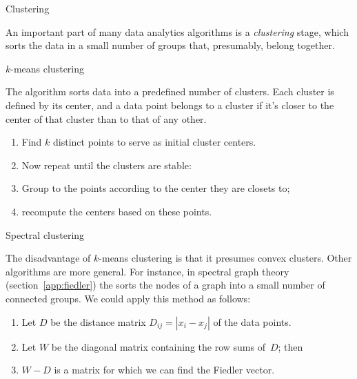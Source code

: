 
\def\R{{\cal R}}

 {Clustering}

An important part of many data analytics algorithms
is a \emph{clustering} stage, which sorts the data
in a small number of groups that, presumably, belong together.

 {$k$-means clustering}

The  algorithm sorts data
into a predefined number of clusters. Each cluster is defined by
its center, and a data point belongs to a cluster if it's closer
to the center of that cluster than to that of any other.

\begin{enumerate}
\item Find $k$ distinct points to serve as initial cluster centers.
\item Now repeat until the clusters are stable:
\item Group to the points according to the center they are closets to;
\item recompute the centers based on these points.
\end{enumerate}

 {Spectral clustering}
\label{sec:spectral-cluster}

The disadvantage of $k$-means clustering is that it presumes convex clusters.
Other algorithms are more general. For instance, in spectral graph theory
(section~\ref{app:fiedler}) the  sorts the nodes of a graph
into a small number of connected groups. We could apply this method as follows:
\begin{enumerate}
\item Let $D$ be the distance matrix $D_{ij}=|x_i-x_j|$ of the data points.
\item Let $W$ be the diagonal matrix containing the row sums of~$D$; then
\item $W-D$ is a matrix for which we can find the Fiedler vector.
\end{enumerate}

